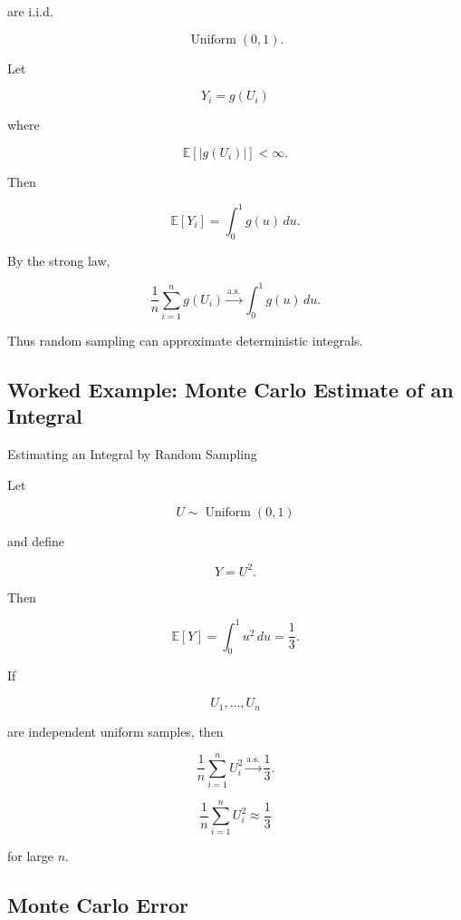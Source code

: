 are i.i.d.

\[
\operatorname{Uniform}(0,1).
\]

Let

\[
Y_i=g(U_i)
\]

where

\[
\mathbb{E}[|g(U_i)|]<\infty.
\]

Then

\[
\mathbb{E}[Y_i]
=
\int_0^1 g(u)\,du.
\]

By the strong law,

\[
\boxed{
\frac1n
\sum_{i=1}^{n}
g(U_i)
\xrightarrow{\text{a.s.}}
\int_0^1g(u)\,du.
}
\]

Thus random sampling can approximate deterministic integrals.

\subsection{Worked Example: Monte Carlo Estimate of an Integral}
\label{subsec:worked-monte-carlo-integral}

\begin{workedexamplebox}{Estimating an Integral by Random Sampling}

Let

\[
U\sim\operatorname{Uniform}(0,1)
\]

and define

\[
Y=U^2.
\]

Then

\[
\mathbb{E}[Y]
=
\int_0^1u^2\,du
=
\frac13.
\]

If

\[
U_1,\ldots,U_n
\]

are independent uniform samples, then

\[
\frac1n
\sum_{i=1}^{n}
U_i^2
\xrightarrow{\text{a.s.}}
\frac13.
\]

\begin{answerbox}
\[
\boxed{
\frac1n
\sum_{i=1}^{n}
U_i^2
\approx
\frac13
}
\]

for large \(n\).
\end{answerbox}

\end{workedexamplebox}

\subsection{Monte Carlo Error}
\label{subsec:monte-carlo-error}

